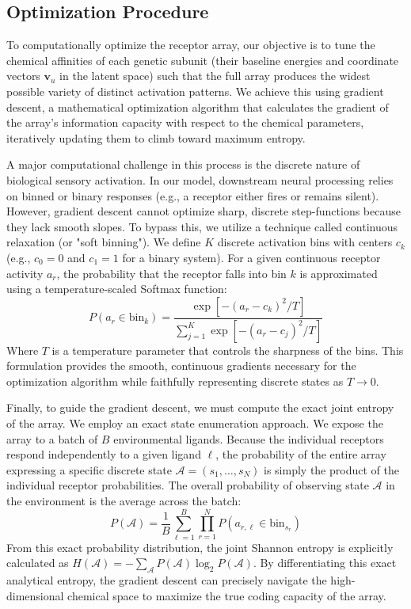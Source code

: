 \documentclass[
    reprint, %
    amsmath,
    amssymb,
    aps,
    prb,      %
    floatfix
]{revtex4-2}
\begin{document}
\subsection{Optimization Procedure}
To computationally optimize the receptor array, our objective is to tune the chemical affinities of each genetic subunit (their baseline energies and coordinate vectors $\textbf{v}_u$ in the latent space) such that the full array produces the widest possible variety of distinct activation patterns. We achieve this using gradient descent, a mathematical optimization algorithm that calculates the gradient of the array's information capacity with respect to the chemical parameters, iteratively updating them to climb toward maximum entropy.

A major computational challenge in this process is the discrete nature of biological sensory activation. In our model, downstream neural processing relies on binned or binary responses (e.g., a receptor either fires or remains silent). However, gradient descent cannot optimize sharp, discrete step-functions because they lack smooth slopes. To bypass this, we utilize a technique called continuous relaxation (or "soft binning"). We define $K$ discrete activation bins with centers $c_k$ (e.g., $c_0=0$ and $c_1=1$ for a binary system). For a given continuous receptor activity $a_r$, the probability that the receptor falls into bin $k$ is approximated using a temperature-scaled Softmax function:
$$
P(a_r \in \text{bin}_k) = \frac{\exp\left[-(a_r - c_k)^2 / T\right]}{\sum_{j=1}^K \exp\left[-(a_r - c_j)^2 / T\right]}
$$
Where $T$ is a temperature parameter that controls the sharpness of the bins. This formulation provides the smooth, continuous gradients necessary for the optimization algorithm while faithfully representing discrete states as $T \to 0$.

Finally, to guide the gradient descent, we must compute the exact joint entropy of the array. 
We employ an exact state enumeration approach. We expose the array to a batch of $B$ environmental ligands. Because the individual receptors respond independently to a given ligand $\ell$, the probability of the entire array expressing a specific discrete state $\mathcal{A} = (s_1, \dots, s_N)$ is simply the product of the individual receptor probabilities. The overall probability of observing state $\mathcal{A}$ in the environment is the average across the batch:
$$
P(\mathcal{A}) = \frac{1}{B} \sum_{\ell=1}^B \prod_{r=1}^N P(a_{r,\ell} \in \text{bin}_{s_r})
$$
From this exact probability distribution, the joint Shannon entropy is explicitly calculated as $H(\mathcal{A}) = -\sum_{\mathcal{A}} P(\mathcal{A}) \log_2 P(\mathcal{A})$. By differentiating this exact analytical entropy, the gradient descent can precisely navigate the high-dimensional chemical space to maximize the true coding capacity of the array.
\end{document}
